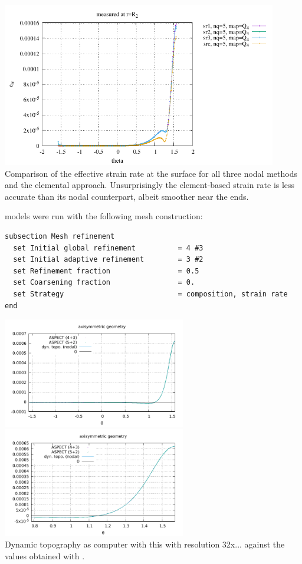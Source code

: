 \begin{center}
\includegraphics[width=12cm]{python_codes/fieldstone_152/results/exp2_axisymmetric/sr_R2_comparison}\\
{\captionfont Comparison of the effective strain rate at the surface for all three nodal methods and the 
elemental approach. Unsurprisingly the element-based strain rate is less accurate than its nodal counterpart, 
albeit smoother near the ends.}
\end{center}

\aspect models were run with the following mesh construction:
\begin{lstlisting}
subsection Mesh refinement
  set Initial global refinement          = 4 #3
  set Initial adaptive refinement        = 3 #2
  set Refinement fraction                = 0.5
  set Coarsening fraction                = 0.
  set Strategy                           = composition, strain rate
end
\end{lstlisting}

\begin{center}
\includegraphics[width=8cm]{python_codes/fieldstone_152/results/exp2_axisymmetric/aspect/dynamic_topography.pdf}
\includegraphics[width=8cm]{python_codes/fieldstone_152/results/exp2_axisymmetric/aspect/dynamic_topography_zoom.pdf}\\
{\captionfont Dynamic topography as computer with this \stone with resolution 32x... against the 
values obtained with \aspect.}
\end{center}

